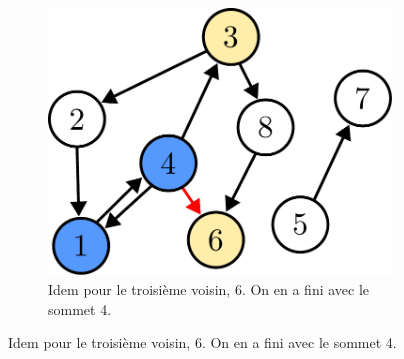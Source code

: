 \documentclass{article}
\begin{document}
\begin{itemize}
\begin{figure}[b]
\begin{subfigure}[t]{0.3\linewidth}
			\includegraphics[width=0.9\linewidth]{../figures/bfs6.pdf}
			\caption{Idem pour le troisième voisin, 6. On en a fini avec le sommet 4.}
		\end{subfigure}
		

\end{figure}
\end{itemize}
\end{document}
